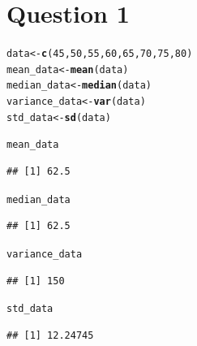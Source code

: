 \documentclass{article}\usepackage[]{graphicx}\usepackage[]{xcolor}
\makeatletter
\newcommand{\hlnum}[1]{\textcolor[rgb]{0.686,0.059,0.569}{#1}}%
\newcommand{\hldef}[1]{\textcolor[rgb]{0.345,0.345,0.345}{#1}}%
\newcommand{\hlkwb}[1]{\textcolor[rgb]{0.69,0.353,0.396}{#1}}%
\newcommand{\hlkwd}[1]{\textcolor[rgb]{0.737,0.353,0.396}{\textbf{#1}}}%
\newenvironment{kframe}{%
 \def\at@end@of@kframe{}%
 \ifinner\ifhmode%
  \def\at@end@of@kframe{\end{minipage}}%
  \begin{minipage}{\columnwidth}%
 \fi\fi%
 \def\FrameCommand##1{\hskip\@totalleftmargin \hskip-\fboxsep
 \colorbox{shadecolor}{##1}\hskip-\fboxsep
     \hskip-\linewidth \hskip-\@totalleftmargin \hskip\columnwidth}%
 \MakeFramed {\advance\hsize-\width
   \@totalleftmargin\z@ \linewidth\hsize
   \@setminipage}}%
 {\par\unskip\endMakeFramed%
 \at@end@of@kframe}
\newenvironment{knitrout}{}{} %
\makeatother
\begin{document}
\section{Question 1}
\begin{knitrout}
\color{fgcolor}\begin{kframe}
\begin{alltt}
\hldef{data} \hlkwb{<-} \hlkwd{c}\hldef{(}\hlnum{45}\hldef{,} \hlnum{50}\hldef{,} \hlnum{55}\hldef{,} \hlnum{60}\hldef{,} \hlnum{65}\hldef{,} \hlnum{70}\hldef{,} \hlnum{75}\hldef{,} \hlnum{80}\hldef{)}
\hldef{mean_data} \hlkwb{<-} \hlkwd{mean}\hldef{(data)}
\hldef{median_data} \hlkwb{<-} \hlkwd{median}\hldef{(data)}
\hldef{variance_data} \hlkwb{<-} \hlkwd{var}\hldef{(data)}
\hldef{std_data} \hlkwb{<-} \hlkwd{sd}\hldef{(data)}

\hldef{mean_data}
\end{alltt}
\begin{verbatim}
## [1] 62.5
\end{verbatim}
\begin{alltt}
\hldef{median_data}
\end{alltt}
\begin{verbatim}
## [1] 62.5
\end{verbatim}
\begin{alltt}
\hldef{variance_data}
\end{alltt}
\begin{verbatim}
## [1] 150
\end{verbatim}
\begin{alltt}
\hldef{std_data}
\end{alltt}
\begin{verbatim}
## [1] 12.24745
\end{verbatim}
\end{kframe}
\end{knitrout}
\end{document}
